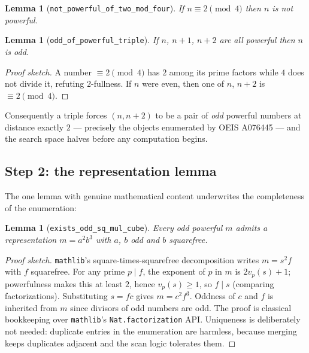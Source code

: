 \documentclass[11pt]{article}
\newtheorem{lemma}[theorem]{Lemma}
\theoremstyle{definition}
\theoremstyle{remark}
\newcommand{\code}[1]{\texttt{#1}}
\begin{document}
\begin{lemma}[\code{not\_powerful\_of\_two\_mod\_four}]
If $n \equiv 2 \pmod 4$ then $n$ is not powerful.
\end{lemma}

\begin{lemma}[\code{odd\_of\_powerful\_triple}]\label{lem:odd}
If $n$, $n+1$, $n+2$ are all powerful then $n$ is odd.
\end{lemma}

\begin{proof}[Proof sketch]
A number $\equiv 2 \pmod 4$ has $2$ among its prime factors while $4$
does not divide it, refuting $2$-fullness. If $n$ were even, then one of
$n$, $n+2$ is $\equiv 2 \pmod 4$.
\end{proof}

Consequently a triple forces $(n, n{+}2)$ to be a pair of \emph{odd}
powerful numbers at distance exactly $2$ --- precisely the objects
enumerated by OEIS A076445 --- and the search space halves before any
computation begins.

\subsection{Step 2: the representation lemma}\label{sec:representation}

The one lemma with genuine mathematical content underwrites the
completeness of the enumeration:

\begin{lemma}[\code{exists\_odd\_sq\_mul\_cube}]\label{lem:rep}
Every odd powerful $m$ admits a representation $m = a^2 b^3$ with $a$,
$b$ odd and $b$ squarefree.
\end{lemma}

\begin{proof}[Proof sketch]
\code{mathlib}'s square-times-squarefree decomposition writes
$m = s^2 f$ with $f$ squarefree. For any prime $p \mid f$, the exponent
of $p$ in $m$ is $2 v_p(s) + 1$; powerfulness makes this at least $2$,
hence $v_p(s) \ge 1$, so $f \mid s$ (comparing factorizations).
Substituting $s = f c$ gives $m = c^2 f^3$. Oddness of $c$ and $f$ is
inherited from $m$ since divisors of odd numbers are odd. The proof is
classical bookkeeping over \code{mathlib}'s \code{Nat.factorization}
API. Uniqueness is deliberately not needed: duplicate entries in the
enumeration are harmless, because merging keeps duplicates adjacent and
the scan logic tolerates them.
\end{proof}
\end{document}
